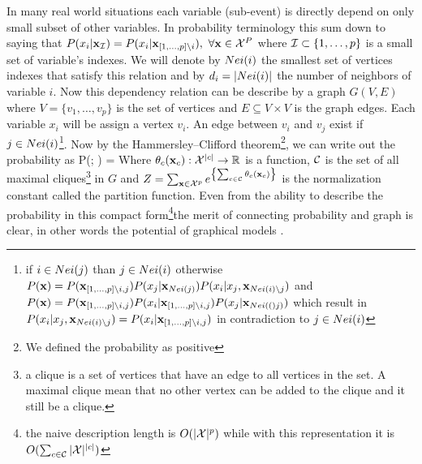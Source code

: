 In many real world situations each variable (sub-event) is directly depend on only small subset of other variables.
In probability terminology this sum down to saying that $P(x_i |{\bf x}_{{\cal I}}) = P(x_i|{\bf x}_{[1,\ldots,p] \setminus i}),\  \forall {\bf x} \in {\cal X}^{P}$ where ${\cal I} \subset \{1,\ldots,p\}$  is a small set of variable's indexes.
We will denote by $Nei(i)$ the smallest set of vertices indexes that satisfy this relation and by $d_i = |Nei(i)|$ the number of neighbors of variable $i$.  
Now this dependency relation can be describe by a graph $G(V,E)$ where $V = \{v_1,\ldots, v_p\}$ is the set of vertices and  $E \subseteq V \times V$ is the graph edges.
Each variable $x_i$ will be assign a vertex $v_i$. 
An edge between $v_i$ and $v_j$ exist if  $j \in Nei(i)$\footnote{if $i \in Nei(j)$ than $j \in Nei(i)$ otherwise $P({\bf x}) = P({\bf x}_{[1,\ldots,p]\setminus i,j}) P(x_j|{\bf x}_{Nei(j)}) P(x_i|x_j,{\bf x}_{Nei(i)\setminus j})$ and $P({\bf x}) = P({\bf x}_{[1,\ldots,p]\setminus i,j}) P(x_i|{\bf x}_{[1,\ldots,p]\setminus i,j}) P(x_j|{\bf x}_{Nei(()j)})$ which result in $P(x_i|x_j,{\bf x}_{Nei(i)\setminus j}) =   P(x_i|{\bf x}_{[1,\ldots,p]\setminus i,j})$ in contradiction to $j \in Nei(i)$}.
Now by the Hammersley–Clifford theorem\cite{hammersley1971markov}\footnote{We defined the probability as positive}, we can write out the probability as
\be
\label{eq:ciluqe_prob}
P(\xx; \thetav) =  
\ee
Where $\theta_{c}({\bf x}_{c}): {\cal X}^{|c|} \to \mathbb{R}$  is a function, ${\cal C}$ is the set of all maximal cliques\footnote{a clique is a set of vertices that have an edge to all vertices in the set. A maximal clique mean that no other vertex can be added to the clique and it still be a clique.} in $G$ and $Z = \sum_{{\bf x} \in {\cal X}^p} e^{\left\{\sum_{c \in {\cal C}}\theta_{c}({\bf x}_{c})\right\}}$ is the normalization constant called the partition function.
Even from the ability to describe the probability in this compact form\footnote{the naive description length is $O(|{\cal X}|^p)$ while with this representation it is $O(\sum_{c \in {\cal C}} |{\cal X}|^{|c|})$}the merit of connecting probability and graph is clear, in other words the potential of graphical models \cite{koller2009probabilistic}.


